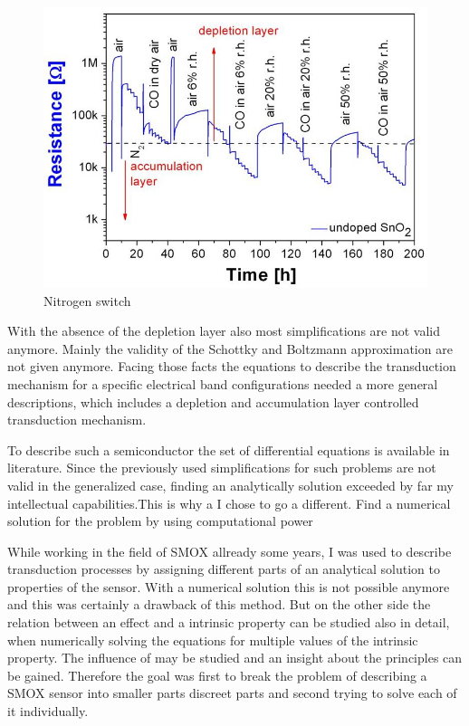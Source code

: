 \documentclass[11pt]{article}
\begin{document}
\begin{figure}
\centering
\includegraphics{media/pics/external_plots/nitroline_switch_julia.jpg}
\caption{Nitrogen switch}
\end{figure}

With the absence of the depletion layer also most simplifications are
not valid anymore. Mainly the validity of the Schottky and Boltzmann
approximation are not given anymore. Facing those facts the equations to
describe the transduction mechanism for a specific electrical band
configurations needed a more general descriptions, which includes a
depletion and accumulation layer controlled transduction mechanism.

To describe such a semiconductor the set of differential equations is
available in literature. Since the previously used simplifications for
such problems are not valid in the generalized case, finding an
analytically solution exceeded by far my intellectual capabilities.This
is why a I chose to go a different. Find a numerical solution for the
problem by using computational power

While working in the field of SMOX allready some years, I was used to
describe transduction processes by assigning different parts of an
analytical solution to properties of the sensor. With a numerical
solution this is not possible anymore and this was certainly a drawback
of this method. But on the other side the relation between an effect and
a intrinsic property can be studied also in detail, when numerically
solving the equations for multiple values of the intrinsic property. The
influence of may be studied and an insight about the principles can be
gained. Therefore the goal was first to break the problem of describing
a SMOX sensor into smaller parts discreet parts and second trying to
solve each of it individually.
\end{document}
